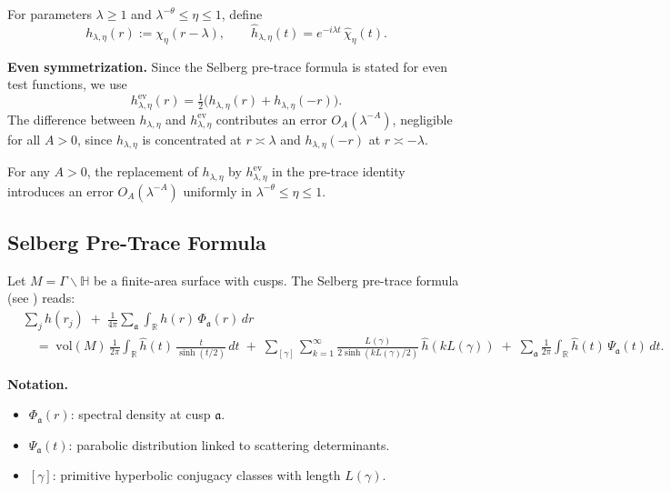 For parameters $\lambda\ge 1$ and $\lambda^{-\theta}\le \eta\le 1$, define
\[
  h_{\lambda,\eta}(r) := \chi_\eta(r-\lambda),
  \qquad
  \widehat{h}_{\lambda,\eta}(t) = e^{-i\lambda t}\, \widehat{\chi}_\eta(t).
\]

\noindent\textbf{Even symmetrization.}  
Since the Selberg pre-trace formula is stated for even test functions, we use
\[
  h_{\lambda,\eta}^{\mathrm{ev}}(r)
  = \tfrac{1}{2}\big(h_{\lambda,\eta}(r)+h_{\lambda,\eta}(-r)\big).
\]
The difference between $h_{\lambda,\eta}$ and $h_{\lambda,\eta}^{\mathrm{ev}}$ contributes an error $O_A(\lambda^{-A})$, negligible for all $A>0$, since $h_{\lambda,\eta}$ is concentrated at $r\asymp\lambda$ and $h_{\lambda,\eta}(-r)$ at $r\asymp -\lambda$.

\begin{lemma}
For any $A>0$, the replacement of $h_{\lambda,\eta}$ by $h_{\lambda,\eta}^{\mathrm{ev}}$ in the pre-trace identity introduces an error $O_A(\lambda^{-A})$ uniformly in $\lambda^{-\theta}\le \eta\le 1$.
\end{lemma}

\subsection{Selberg Pre-Trace Formula}

Let $M=\Gamma\backslash\mathbb{H}$ be a finite-area surface with cusps.
The Selberg pre-trace formula (see \cite{Selberg1956,Hejhal1983,Iwaniec2002}) reads:
\begin{align}\label{eq:7.5-pretrace}
  &\sum_{j} h(r_j)
  \;+\; \frac{1}{4\pi}\sum_{\mathfrak{a}}\int_{\mathbb{R}} h(r)\, \Phi_\mathfrak{a}(r)\, dr \\
  &\quad=\; \mathrm{vol}(M)\,\frac{1}{2\pi}\int_{\mathbb{R}} \widehat{h}(t)\,\frac{t}{\sinh(t/2)}\, dt
  \;+\; \sum_{[\gamma]}\sum_{k=1}^\infty
      \frac{L(\gamma)}{2\sinh(kL(\gamma)/2)}\, \widehat{h}(kL(\gamma))
  \;+\; \sum_{\mathfrak{a}} \frac{1}{2\pi}\int_{\mathbb{R}}
      \widehat{h}(t)\,\Psi_\mathfrak{a}(t)\, dt. \nonumber
\end{align}

\noindent\textbf{Notation.}
\begin{itemize}
  \item $\Phi_\mathfrak{a}(r)$: spectral density at cusp $\mathfrak{a}$.
  \item $\Psi_\mathfrak{a}(t)$: parabolic distribution linked to scattering determinants.
  \item $[\gamma]$: primitive hyperbolic conjugacy classes with length $L(\gamma)$.
\end{itemize}

